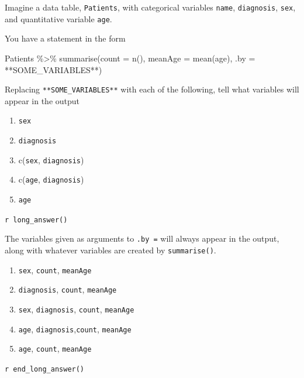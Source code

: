 \documentclass[
  letterpaper,
  DIV=11,
  numbers=noendperiod,
  oneside]{scrartcl}
\newenvironment{Shaded}{\begin{snugshade}}{\end{snugshade}}
\newcommand{\AttributeTok}[1]{\textcolor[rgb]{0.40,0.45,0.13}{#1}}
\newcommand{\FunctionTok}[1]{\textcolor[rgb]{0.28,0.35,0.67}{#1}}
\newcommand{\NormalTok}[1]{\textcolor[rgb]{0.00,0.23,0.31}{#1}}
\newcommand{\SpecialCharTok}[1]{\textcolor[rgb]{0.37,0.37,0.37}{#1}}
\providecommand{\tightlist}{%
  \setlength{\itemsep}{0pt}\setlength{\parskip}{0pt}}\usepackage{longtable,booktabs,array}
\begin{document}
\begin{tcolorbox}[enhanced jigsaw, colbacktitle=quarto-callout-note-color!10!white, opacityback=0, breakable, opacitybacktitle=0.6, colback=white, coltitle=black, arc=.35mm, title=\textcolor{quarto-callout-note-color}{\faInfo}\hspace{0.5em}{Exercise 5.36 seaweed-tug-kayak}, left=2mm, colframe=quarto-callout-note-color-frame, rightrule=.15mm, bottomrule=.15mm, leftrule=.75mm, bottomtitle=1mm, toptitle=1mm, titlerule=0mm, toprule=.15mm]

Imagine a data table, \texttt{Patients}, with categorical variables
\texttt{name}, \texttt{diagnosis}, \texttt{sex}, and quantitative
variable \texttt{age}.

You have a statement in the form

\begin{Shaded}
\begin{Highlighting}[]
\NormalTok{Patients }\SpecialCharTok{\%\textgreater{}\%}
  \FunctionTok{summarise}\NormalTok{(}\AttributeTok{count =} \FunctionTok{n}\NormalTok{(), }\AttributeTok{meanAge =} \FunctionTok{mean}\NormalTok{(age), }
            \AttributeTok{.by =} \SpecialCharTok{**}\NormalTok{SOME\_VARIABLES}\SpecialCharTok{**}\NormalTok{)}
\end{Highlighting}
\end{Shaded}

Replacing \texttt{**SOME\_VARIABLES**} with each of the following, tell
what variables will appear in the output

\begin{enumerate}
\def\labelenumi{\alph{enumi}.}
\tightlist
\item
  \texttt{sex}
\item
  \texttt{diagnosis}
\item
  c(\texttt{sex}, \texttt{diagnosis})
\item
  c(\texttt{age}, \texttt{diagnosis})
\item
  \texttt{age}
\end{enumerate}

\texttt{r\ long\_answer()}

The variables given as arguments to \texttt{.by\ =} will always appear
in the output, along with whatever variables are created by
\texttt{summarise()}.

\begin{enumerate}
\def\labelenumi{\alph{enumi}.}
\tightlist
\item
  \texttt{sex}, \texttt{count}, \texttt{meanAge}
\item
  \texttt{diagnosis}, \texttt{count}, \texttt{meanAge}
\item
  \texttt{sex}, \texttt{diagnosis}, \texttt{count}, \texttt{meanAge}
\item
  \texttt{age}, \texttt{diagnosis},\texttt{count}, \texttt{meanAge}
\item
  \texttt{age}, \texttt{count}, \texttt{meanAge}
\end{enumerate}

\texttt{r\ end\_long\_answer()}

\end{tcolorbox}
\end{document}
